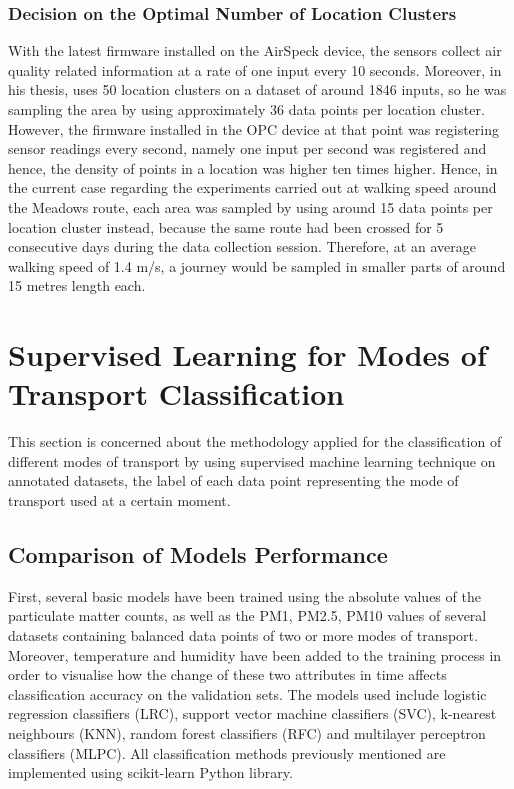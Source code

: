 \documentclass[bsc,frontabs,twoside,singlespacing, parskip,deptreport]{infthesis}     %
\begin{document}
\subsubsection*{Decision on the Optimal Number of Location Clusters}

With the latest firmware installed on the AirSpeck device, the sensors collect air quality related information at a rate of one input every 10 seconds. Moreover, in his thesis, \cite{Kotsev2015} uses 50 location clusters on a dataset of around 1846 inputs, so he was sampling the area by using approximately 36 data points per location cluster. However, the firmware installed in the OPC device at that point was registering sensor readings every second, namely one input per second was registered and hence, the density of points in a location was higher ten times higher. Hence,  in the current case regarding the experiments carried out at walking speed around the Meadows route, each area was sampled by using around 15 data points per location cluster instead, because the same route had been crossed for 5 consecutive days during the data collection session. Therefore, at an average walking speed of 1.4 m/s, a journey would be sampled in smaller parts of around 15 metres length each.

\section{Supervised Learning for Modes of Transport Classification}

This section is concerned about the methodology applied for the classification of different modes of transport by using supervised machine learning technique on annotated datasets, the label of each data point representing the mode of transport used at a certain moment.

\subsection{Comparison of Models Performance}

First, several basic models have been trained using the absolute values of the particulate matter counts, as well as the PM1, PM2.5, PM10 values of several datasets containing balanced data points of two or more modes of transport. Moreover, temperature and humidity have been added to the training process in order to visualise how the change of these two attributes in time affects classification accuracy on the validation sets. The models used include logistic regression classifiers (LRC), support vector machine classifiers (SVC), k-nearest neighbours (KNN), random forest classifiers (RFC) and multilayer perceptron classifiers (MLPC). All classification methods previously mentioned are implemented using scikit-learn Python library.
\end{document}
